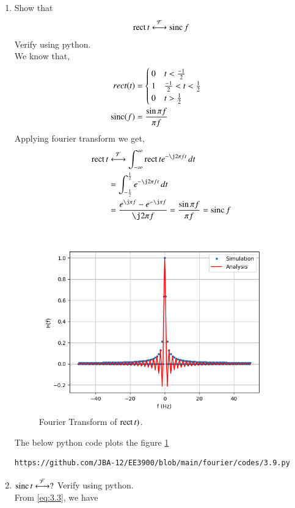 \documentclass[journal,12pt,twocolumn]{IEEEtran}
\renewcommand\thesection{\arabic{section}}
\begin{document}
\begin{enumerate}[label=\thesection.\arabic*
	,ref=\thesection.\theenumi]
%	
	\item Show that
	\begin{align}
		\mathop{\mathrm{rect}}{t} \overset{\mathcal{F}}{ \longleftrightarrow} \mathop{\mathrm{sinc}}{f}
	\end{align}
	Verify using python.\\
	\solution We know that,
	\begin{align}
		rect(t)&=
	\begin{cases}
		0 \quad t<\frac{-1}{2}\\
		1 \quad \frac{-1}{2}<t<\frac{1}{2}\\
		0 \quad t>\frac{1}{2}
	\end{cases}\\
\mathop{\mathrm{sinc}}(f)&=\frac{\sin{\pi f}}{\pi f}
	\end{align}
Applying fourier transform we get,
	\begin{align}
		\rect{t}&\system{F}\int_{-\infty}^{\infty}\rect{t} e^{-\j2\pi ft}\, dt \\
		&=\int_{-\frac{1}{2}}^{\frac{1}{2}}e^{-\j 2\pi ft}\, dt \\
		\label{eq:fourierrect}
		&=\frac{e^{\j\pi f} - e^{-\j\pi f}}{\j2\pi f} = \frac{\sin{\pi f}}{\pi f} = \sinc{f}
	\end{align}
	\begin{figure}[!ht]
	\includegraphics[width=\columnwidth]{figs/3.9.png}
	\caption{Fourier Transform of $\mathop{\mathrm{rect}}{t})$.}
	\label{fig:3.9}
\end{figure}
The below python code plots the figure \ref{fig:3.9}
	\begin{lstlisting}
https://github.com/JBA-12/EE3900/blob/main/fourier/codes/3.9.py
\end{lstlisting} 
	\item $\mathop{\mathrm{sinc}}{t}\overset{\mathcal{F}}{ \longleftrightarrow} ?$  Verify using python.\\
	\solution From \eqref{eq:3.3}, we have 
	

\end{enumerate}
\end{document}
